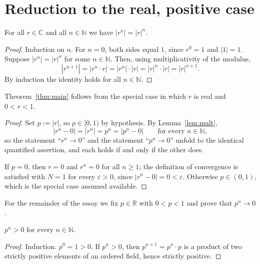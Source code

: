 \documentclass{essay}
\begin{document}
\section{Reduction to the real, positive case}

\begin{lemma}\label{lem:mult}
  For all \(r \in \mathbb{C}\) and all \(n \in \mathbb{N}\) we have \(|r^{n}| = |r|^{n}\).
\end{lemma}

\begin{proof}
  Induction on \(n\). For \(n = 0\), both sides equal \(1\), since \(r^{0} = 1\) and
  \(|1| = 1\). Suppose \(|r^{n}| = |r|^{n}\) for some \(n \in \mathbb{N}\). Then, using
  multiplicativity of the modulus,
  \[ |r^{n+1}| = |r^{n} \cdot r| = |r^{n}| \cdot |r| = |r|^{n} \cdot |r| = |r|^{n+1}. \]
  By induction the identity holds for all \(n \in \mathbb{N}\).
\end{proof}

\begin{proposition}[Reduction]\label{prop:reduction}
  Theorem~\ref{thm:main} follows from the special case in which \(r\) is real and
  \(0 < r < 1\).
\end{proposition}

\begin{proof}
  Set \(p := |r|\), so \(p \in [0,1)\) by hypothesis. By Lemma~\ref{lem:mult},
  \[ |r^{n} - 0| = |r^{n}| = p^{n} = |p^{n} - 0| \qquad \text{for every } n \in \mathbb{N}, \]
  so the statement ``\(r^{n} \to 0\)'' and the statement ``\(p^{n} \to 0\)'' unfold to
  the identical quantified assertion, and each holds if and only if the other does.

  If \(p = 0\), then \(r = 0\) and \(r^{n} = 0\) for all \(n \geq 1\); the definition of
  convergence is satisfied with \(N = 1\) for every \(\varepsilon > 0\), since
  \(|r^{n} - 0| = 0 < \varepsilon\). Otherwise \(p \in (0,1)\), which is the special case
  assumed available.
\end{proof}

For the remainder of the essay we fix \(p \in \mathbb{R}\) with \(0 < p < 1\) and prove
that \(p^{n} \to 0\).

\begin{lemma}\label{lem:positive}
  \(p^{n} > 0\) for every \(n \in \mathbb{N}\).
\end{lemma}

\begin{proof}
  Induction. \(p^{0} = 1 > 0\). If \(p^{n} > 0\), then \(p^{n+1} = p^{n} \cdot p\) is a
  product of two strictly positive elements of an ordered field, hence strictly
  positive.
\end{proof}
\end{document}
